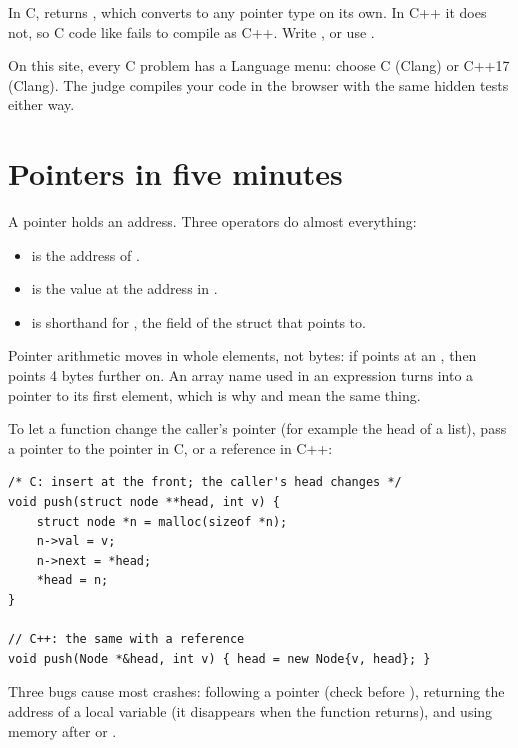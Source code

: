 \begin{trap}
In C,  returns , which converts to any pointer type on its own. In C++ it does not, so C code like  fails to compile as C++. Write , or use .
\end{trap}

On this site, every C problem has a Language menu: choose C (Clang) or C++17 (Clang). The judge compiles your code in the browser with the same hidden tests either way.

\section{Pointers in five minutes}

A pointer holds an address. Three operators do almost everything:

\begin{itemize}
  \item {} is the address of .
  \item {} is the value at the address in .
  \item {} is shorthand for , the field of the struct that  points to.
\end{itemize}

Pointer arithmetic moves in whole elements, not bytes: if  points at an , then  points 4 bytes further on. An array name used in an expression turns into a pointer to its first element, which is why  and  mean the same thing.

To let a function change the caller's pointer (for example the head of a list), pass a pointer to the pointer in C, or a reference in C++:

\begin{lstlisting}
/* C: insert at the front; the caller's head changes */
void push(struct node **head, int v) {
    struct node *n = malloc(sizeof *n);
    n->val = v;
    n->next = *head;
    *head = n;
}

// C++: the same with a reference
void push(Node *&head, int v) { head = new Node{v, head}; }
\end{lstlisting}

\begin{trap}
Three bugs cause most crashes: following a  pointer (check before ), returning the address of a local variable (it disappears when the function returns), and using memory after  or .
\end{trap}


